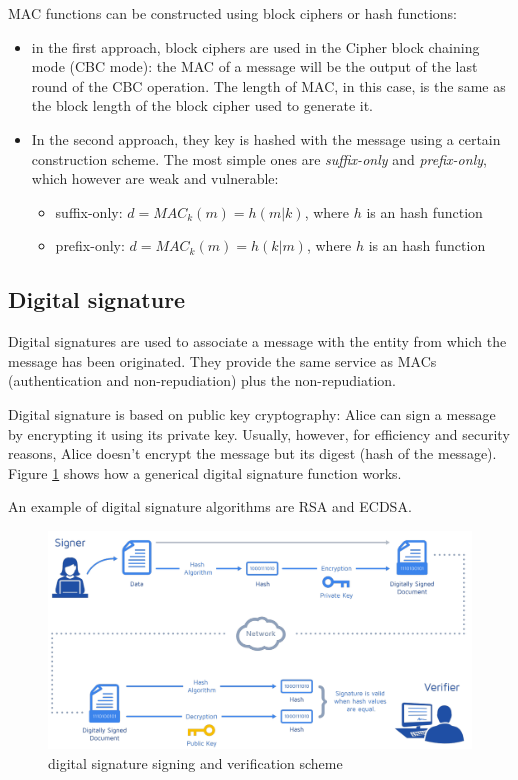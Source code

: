 MAC functions can be constructed using block ciphers or hash functions:
\begin{itemize}
  \item in the first approach, block ciphers are used in the Cipher block chaining mode (CBC mode):
  the MAC of a message will be the output of the last round of the CBC operation.
  The length of MAC, in this case, is the same as the block length of the block cipher
  used to generate it.
  \item In the second approach, they key is hashed with the message using a certain
  construction scheme. The most simple ones are \emph{suffix-only} and
  \emph{prefix-only}, which however are weak and vulnerable:
  \begin{itemize}
    \item suffix-only: ${d=MAC_k(m)=h(m|k)}$, where $h$ is an hash function
    \item prefix-only: ${d=MAC_k(m)=h(k|m)}$, where $h$ is an hash function
  \end{itemize}
\end{itemize}





\subsection{Digital signature}
Digital signatures are used to associate a message with the entity from which the
message has been originated. They provide the same service as MACs (authentication
and non-repudiation) plus the non-repudiation.

Digital signature is based on public key cryptography: Alice can sign a message
by encrypting it using its private key. Usually, however, for efficiency and security
reasons, Alice doesn't encrypt the message but its digest (hash of the message).
Figure \ref{fig:digital-signature} shows how a generical digital signature function
works.

An example of digital signature algorithms are RSA and ECDSA.

\begin{figure}[!htb]
	\centering
	\includegraphics[width=1\linewidth]{img/digital-signature.png}
	\caption{digital signature signing and verification scheme}
	\label{fig:digital-signature}
\end{figure}





